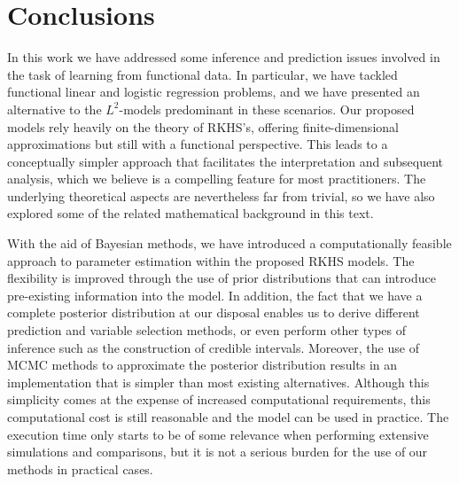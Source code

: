 %
%

\chapter{Conclusions}\label{ch:conclusions}

In this work we have addressed some inference and prediction issues involved in the task of learning from functional data. In particular, we have tackled functional linear and logistic regression problems, and we have presented an alternative to the \(L^2\)-models predominant in these scenarios. Our proposed models rely heavily on the theory of RKHS's, offering finite-dimensional approximations but still with a functional perspective. This leads to a conceptually simpler approach that facilitates the interpretation and subsequent analysis, which we believe is a compelling feature for most practitioners. The underlying theoretical aspects are nevertheless far from trivial, so we have also explored some of the related mathematical background in this text.

With the aid of Bayesian methods, we have introduced a computationally feasible approach to parameter estimation within the proposed RKHS models. The flexibility is improved through the use of prior distributions that can introduce pre-existing information into the model. In addition, the fact that we have a complete posterior distribution at our disposal enables us to derive different prediction and variable selection methods, or even perform other types of inference such as the construction of credible intervals. Moreover, the use of MCMC methods to approximate the posterior distribution results in an implementation that is simpler than most existing alternatives. Although this simplicity comes at the expense of increased computational requirements, this computational cost is still reasonable and the model can be used in practice. The execution time only starts to be of some relevance when performing extensive simulations and comparisons, but it is not a serious burden for the use of our methods in practical cases.

